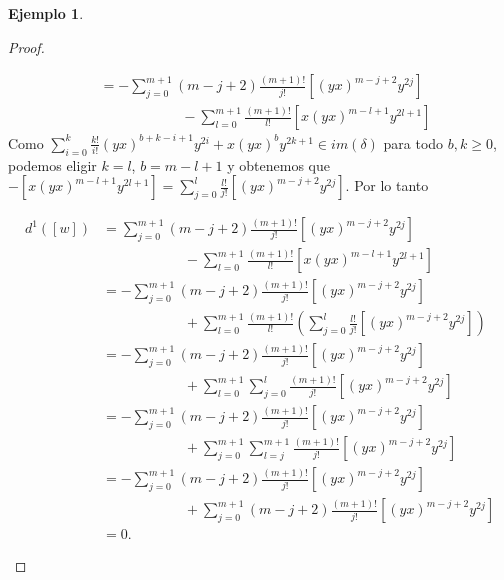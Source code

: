 \documentclass[a4paper,oneside,fleqn,11pt]{report}
\theoremstyle{definition}
\theoremstyle{definition}
\newtheorem{example}{Ejemplo}[section]
\numberwithin{prop}{subsection}
\begin{document}
\begin{example}
\begin{proof}
\begin{itemize}
\begin{align*}
				&= -\sum_{j = 0}^{m + 1}(m - j + 2)\frac{(m + 1)!}{j!}\left[(yx)^{m -j + 2}y^{2j}\right]\\
				& \hspace{70pt}-\sum_{l = 0}^{m + 1}\frac{(m + 1)!}{l!}\left[x(yx)^{m - l + 1}y^{2l + 1}\right]			
			\end{align*}
			Como $\sum_{i = 0}^k\frac{k!}{i!}(yx)^{b + k - i + 1}y^{2i} + x(yx)^by^{2k + 1} \in im(\delta)$
			para todo $b,k \geq 0$, podemos eligir $k = l$, $b = m - l + 1$ y obtenemos que
				$-\left[x(yx)^{m - l + 1}y^{2l + 1}\right]
					= \sum_{j = 0}^l\frac{l!}{j!}\left[(yx)^{m - j + 2}y^{2j}\right].$
			Por lo tanto
			
			\begin{align*}
				d^1(\left[w\right]) &=
					\sum_{j = 0}^{m + 1}(m - j + 2)\frac{(m + 1)!}{j!}\left[(yx)^{m -j + 2}y^{2j}\right]\\
				& \hspace{70pt}-\sum_{l = 0}^{m + 1}\frac{(m + 1)!}{l!}\left[x(yx)^{m - l + 1}y^{2l + 1}\right] \\
				&=-\sum_{j = 0}^{m + 1}(m - j + 2)\frac{(m + 1)!}{j!}\left[(yx)^{m -j + 2}y^{2j}\right]\\
				& \hspace{70pt} + \sum_{l = 0}^{m + 1}\frac{(m + 1)!}{l!}
					\left(\sum_{j = 0}^l\frac{l!}{j!}\left[(yx)^{m - j + 2}y^{2j}\right]\right) \\
				&= -	\sum_{j = 0}^{m + 1}(m - j + 2)\frac{(m + 1)!}{j!}\left[(yx)^{m -j + 2}y^{2j}\right]\\
				& \hspace{70pt} + \sum_{l = 0}^{m + 1}\sum_{j = 0}^{l}\frac{(m + 1)!}{j!}
					\left[(yx)^{m - j + 2}y^{2j}\right]\\
				&= -	\sum_{j = 0}^{m + 1}(m - j + 2)\frac{(m + 1)!}{j!}\left[(yx)^{m -j + 2}y^{2j}\right]\\
				& \hspace{70pt} + \sum_{j = 0}^{m + 1}\sum_{l = j}^{m + 1}\frac{(m + 1)!}{j!}
					\left[(yx)^{m - j + 2}y^{2j}\right]\\
				&= -	\sum_{j = 0}^{m + 1}(m - j + 2)\frac{(m + 1)!}{j!}\left[(yx)^{m -j + 2}y^{2j}\right]\\
				& \hspace{70pt} + \sum_{j = 0}^{m + 1}(m - j + 2)\frac{(m + 1)!}{j!}
					\left[(yx)^{m - j + 2}y^{2j}\right]\\
				&= 0.
			\end{align*}	 
	\end{itemize}
\end{proof}


\end{example}
\end{document}
